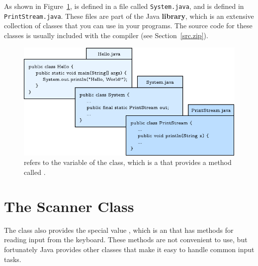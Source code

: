 
As shown in Figure~\ref{fig.system},  is defined in a file called {\tt System.java}, and  is defined in {\tt PrintStream.java}.
These files are part of the Java {\bf library}, which is an extensive collection of classes that you can use in your programs.
The source code for these classes is usually included with the compiler (see Section~\ref{src.zip}).

\begin{figure}[!ht]
\begin{center}
\includegraphics{figs/system.pdf}
\caption{ refers to the  variable of the  class, which is a  that provides a method called .}
\label{fig.system}
\end{center}
\end{figure}


\section{The Scanner Class}
\label{scanner}


%


The  class also provides the special value , which is an  that has methods for reading input from the keyboard.
These methods are not convenient to use, but fortunately Java provides other classes that make it easy to handle common input tasks.

